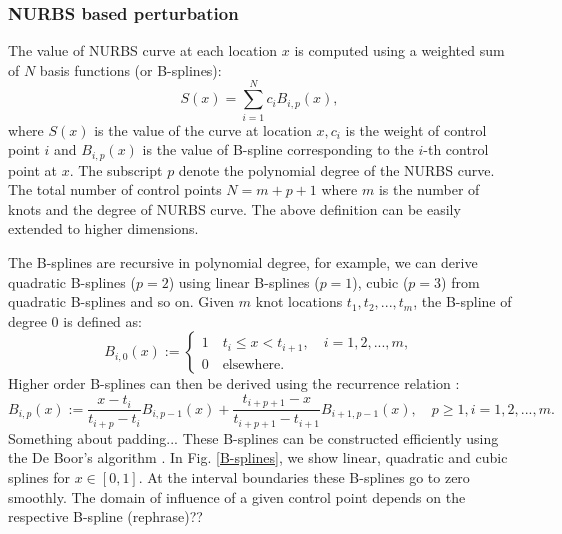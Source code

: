 \documentclass[review]{elsarticle}
\numberwithin{equation}{section}
\numberwithin{equation}{section}
\begin{document}
\subsubsection{NURBS based perturbation}
The value of NURBS curve at each location $x$ is computed using a weighted sum of $N$ basis functions (or B-splines):
\begin{equation}\label{NURB_curve}
S(x)  = \sum_{i=1}^{N} c_i B_{i,p}(x),
\end{equation}
where $S(x)$ is the value of the curve at location $x, c_i$ is the weight of control point $i$ and $B_{i,p}(x)$ is the value of B-spline corresponding to the $i$-th control point at $x$. The subscript $p$ denote the polynomial degree of the NURBS curve. The total number of control points $N = m+p+1$ where $m$ is the number of knots  and the degree of NURBS curve. The above definition can be easily extended to higher dimensions. 

The B-splines are recursive in polynomial degree, for example, we can derive quadratic B-splines ($p=2$) using linear B-splines ($p=1$), cubic ($p=3$) from quadratic B-splines and so on. Given $m$ knot locations $t_1, t_2, ..., t_{m}$, the B-spline of degree 0 is defined as:
\begin{equation}\label{linearBspline}
B_{i,0}(x) :=
\begin{cases}
1\quad t_i\leq x < t_{i+1},\quad i = 1,2,...,m,\\
0\quad\text{elsewhere.}
\end{cases} 
\end{equation}
Higher order B-splines can then be derived using the recurrence relation \cite{deBoor}:
\begin{equation}\label{NURBS_recurrence}
B_{i,p}(x) := \frac{x-t_i}{t_{i+p} - t_i}B_{i,p-1}(x) + \frac{t_{i+p+1}  -  x}{t_{i+p+1}  -  t_{i+1}}B_{i+1,p-1}(x),\quad p\geq1, i = 1,2,...,m.
\end{equation} 
Something about padding...
These B-splines can be constructed efficiently using the De Boor's algorithm \cite{deBoor}. In Fig. \ref{B-splines}, we show linear, quadratic and cubic splines for $x\in[0,1]$. At the interval boundaries these B-splines go to zero smoothly. The domain of influence of a given control point depends on the respective B-spline (rephrase)??
\end{document}
